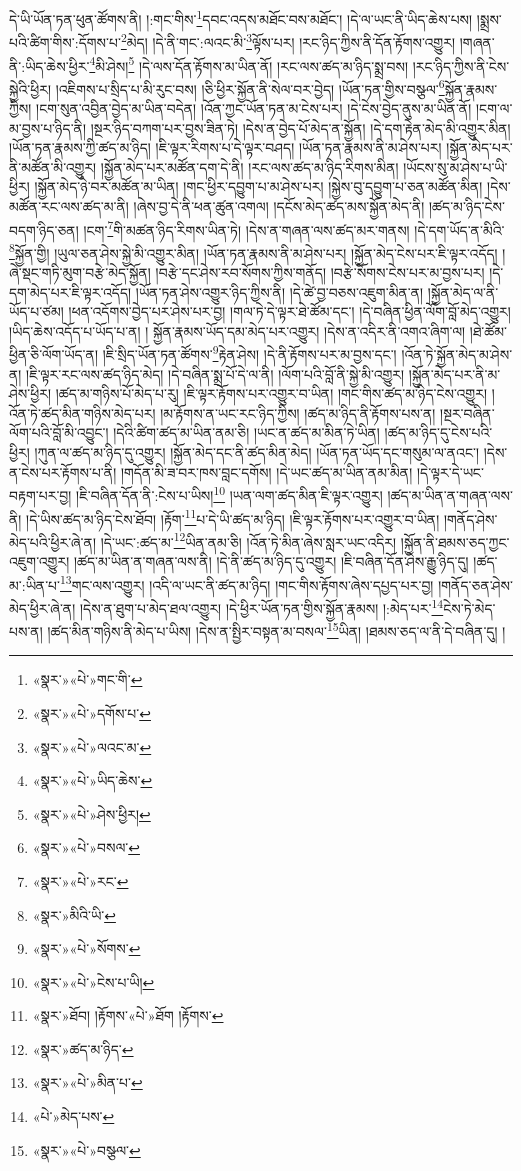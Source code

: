 དེ་ཡི་ཡོན་ཏན་ཕུན་ཚོགས་ནི། །:གང་གིས་\footnote{«སྣར་»«པེ་»གང་གི་}དབང་འདས་མཐོང་བས་མཐོང་། །དེ་ལ་ཡང་ནི་ཡིད་ཆེས་པས། །སྨྲས་པའི་ཚིག་གིས་:དོགས་པ་\footnote{«སྣར་»«པེ་»དགོས་པ་}མེད། །དེ་ནི་གང་:ལའང་མི་\footnote{«སྣར་»«པེ་»ལའང་མ་}ལྟོས་པར། །རང་ཉིད་ཀྱིས་ནི་དོན་རྟོགས་འགྱུར། །གཞན་ནི་:ཡིད་ཆེས་ཕྱིར་\footnote{«སྣར་»«པེ་»ཡིད་ཆེས་}མི་ཤེས།\footnote{«སྣར་»«པེ་»ཤེས་ཕྱིར།} །དེ་ལས་དོན་རྟོགས་མ་ཡིན་ནོ། །རང་ལས་ཚད་མ་ཉིད་སྨྲ་བས། །རང་ཉིད་ཀྱིས་ནི་ངེས་སྐྱེའི་ཕྱིར། །འཇིགས་པ་སྲིད་པ་མི་རུང་བས། །ཅི་ཕྱིར་སྐྱོན་ནི་སེལ་བར་བྱེད། །ཡོན་ཏན་གྱིས་བསྩལ་\footnote{«སྣར་»«པེ་»བསལ་}སྐྱོན་རྣམས་ཀྱིས། །ངག་སུན་འབྱིན་བྱེད་མ་ཡིན་བདེན། །འོན་ཀྱང་ཡོན་ཏན་མ་ངེས་པར། །དེ་ངེས་བྱེད་ནུས་མ་ཡིན་ནོ། །ངག་ལ་མ་བྱས་པ་ཉིད་ནི། །སྔར་ཉིད་བཀག་པར་བྱས་ཟིན་ཏེ། །དེས་ན་བྱེད་པོ་མེད་ན་སྐྱོན། །དེ་དག་རྟེན་མེད་མི་འགྱུར་མིན། །ཡོན་ཏན་རྣམས་ཀྱི་ཚད་མ་ཉིད། །ཇི་ལྟར་རིགས་པ་དེ་ལྟར་བཤད། །ཡོན་ཏན་རྣམས་ནི་མ་ཤེས་པར། །སྐྱོན་མེད་པར་ནི་མཚོན་མི་འགྱུར། །སྐྱོན་མེད་པར་མཚོན་དག་དེ་ནི། །རང་ལས་ཚད་མ་ཉིད་རིགས་མིན། །ཡོངས་སུ་མ་ཤེས་པ་ཡི་ཕྱིར། །སྐྱོན་མེད་ཉེ་བར་མཚོན་མ་ཡིན། །གང་ཕྱིར་དབྱུག་པ་མ་ཤེས་པར། །སྐྱེས་བུ་དབྱུག་པ་ཅན་མཚོན་མིན། །དེས་མཚོན་རང་ལས་ཚད་མ་ནི། །ཞེས་བྱ་དེ་ནི་ཕན་ཚུན་འགལ། །དངོས་མེད་ཚད་མས་སྐྱོན་མེད་ནི། །ཚད་མ་ཉིད་ངེས་བདག་ཉིད་ཅན། །ངག་\footnote{«སྣར་»«པེ་»རང་}གི་མཚན་ཉིད་རིགས་ཡིན་ཏེ། །དེས་ན་གཞན་ལས་ཚད་མར་གནས། །དེ་དག་ཡོད་ན་མིའི་\footnote{«སྣར་»མིའི་ཡི་}སྐྱོན་གྱི། །ཡུལ་ཅན་ཤེས་སྐྱེ་མི་འགྱུར་མིན། །ཡོན་ཏན་རྣམས་ནི་མ་ཤེས་པར། །སྐྱོན་མེད་ངེས་པར་ཇི་ལྟར་འདོད། །ཞེ་སྡང་གཏི་མུག་བརྩེ་མེད་སྐྱོན། །བརྩེ་དང་ཤེས་རབ་སོགས་ཀྱིས་གནོད། །བརྩེ་སོགས་ངེས་པར་མ་བྱས་པར། །དེ་དག་མེད་པར་ཇི་ལྟར་འདོད། །ཡོན་ཏན་ཤེས་འགྱུར་ཉིད་ཀྱིས་ནི། །དེ་ཚེ་བྱ་བཅས་འཇུག་མིན་ན། །སྐྱོན་མེད་ལ་ནི་ཡོད་པ་ཙམ། །ཕན་འདོགས་བྱེད་པར་ཤེས་པར་བྱ། །གལ་ཏེ་དེ་ལྟར་ཐེ་ཚོམ་དང་། །དེ་བཞིན་ཕྱིན་ལོག་བློ་མེད་འགྱུར། །ཡིད་ཆེས་འདོད་པ་ཡོད་པ་ན། །
སྐྱོན་རྣམས་ཡོད་དམ་མེད་པར་འགྱུར། །དེས་ན་འདིར་ནི་འགའ་ཞིག་ལ། །ཐེ་ཚོམ་ཕྱིན་ཅི་ལོག་ཡོད་ན། །ཇི་སྲིད་ཡོན་ཏན་ཚོགས་\footnote{«སྣར་»«པེ་»སོགས་}རྟེན་ཤེས། །དེ་ནི་རྟོགས་པར་མ་བྱས་དང་། །འོན་ཏེ་སྐྱོན་མེད་མ་ཤེས་ན། །ཇི་ལྟར་རང་ལས་ཚད་ཉིད་མེད། །དེ་བཞིན་སྨྲ་པོ་དེ་ལ་ནི། །ལོག་པའི་བློ་ནི་སྐྱེ་མི་འགྱུར། །སྐྱོན་མེད་པར་ནི་མ་ཤེས་ཕྱིར། །ཚད་མ་གཉིས་པོ་མེད་པ་རུ། །ཇི་ལྟར་རྟོགས་པར་འགྱུར་བ་ཡིན། །གང་གིས་ཚད་མ་ཉིད་ངེས་འགྱུར། །འོན་ཏེ་ཚད་མིན་གཉིས་མེད་པར། །མ་རྟོགས་ན་ཡང་རང་ཉིད་ཀྱིས། །ཚད་མ་ཉིད་ནི་རྟོགས་པས་ན། །སྔར་བཞིན་ལོག་པའི་བློ་མི་འབྱུང་། །དེའི་ཚིག་ཚད་མ་ཡིན་ནམ་ཅི། །ཡང་ན་ཚད་མ་མིན་ཏེ་ཡིན། །ཚད་མ་ཉིད་དུ་ངེས་པའི་ཕྱིར། །ཀུན་ལ་ཚད་མ་ཉིད་དུ་འགྱུར། །སྐྱོན་མེད་དང་ནི་ཚད་མིན་མེད། །ཡོན་ཏན་ཡོད་དང་གསུམ་ལ་ནའང་། །དེས་ན་ངེས་པར་རྟོགས་པ་ནི། །གདོན་མི་ཟ་བར་ཁས་བླང་དགོས། །དེ་ཡང་ཚད་མ་ཡིན་ནམ་མིན། །དེ་ལྟར་དེ་ཡང་བརྟག་པར་བྱ། །ཇི་བཞིན་དོན་ནི་:ངེས་པ་ཡིས།\footnote{«སྣར་»«པེ་»ངེས་པ་ཡི།} །ཡན་ལག་ཚད་མིན་ཇི་ལྟར་འགྱུར། །ཚད་མ་ཡིན་ན་གཞན་ལས་ནི། །དེ་ཡིས་ཚད་མ་ཉིད་ངེས་ཐོབ། །རྟོག་\footnote{«སྣར་»ཐོབ། །རྟོགས་«པེ་»ཐོག །རྟོགས་}པ་དེ་ཡི་ཚད་མ་ཉིད། །ཇི་ལྟར་རྟོགས་པར་འགྱུར་བ་ཡིན། །གནོད་ཤེས་མེད་པའི་ཕྱིར་ཞེ་ན། །དེ་ཡང་:ཚད་མ་\footnote{«སྣར་»ཚད་མ་ཉིད་}ཡིན་ནམ་ཅི། །འོན་ཏེ་མིན་ཞེས་སླར་ཡང་འདིར། །སྐྱོན་ནི་ཐམས་ཅད་ཀྱང་འཇུག་འགྱུར། །ཚད་མ་ཡིན་ན་གཞན་ལས་ནི། །དེ་ནི་ཚད་མ་ཉིད་དུ་འགྱུར། །ཇི་བཞིན་དོན་ཤེས་རྒྱུ་ཉིད་དུ། །ཚད་མ་:ཡིན་པ་\footnote{«སྣར་»«པེ་»མིན་པ་}གང་ལས་འགྱུར། །འདི་ལ་ཡང་ནི་ཚད་མ་ཉིད། །གང་གིས་རྟོགས་ཞེས་དཔྱད་པར་བྱ། །གནོད་ཅན་ཤེས་མེད་ཕྱིར་ཞེ་ན། །དེས་ན་ཐུག་པ་མེད་ཐལ་འགྱུར། །དེ་ཕྱིར་ཡོན་ཏན་གྱིས་སྐྱོན་རྣམས། །:མེད་པར་\footnote{«པེ་»མེད་པས་}ངེས་ཏེ་མེད་པས་ན། །ཚད་མིན་གཉིས་ནི་མེད་པ་ཡིས། །དེས་ན་སྤྱིར་བསྟན་མ་བསལ་\footnote{«སྣར་»«པེ་»བསྩལ་}ཡིན། །ཐམས་ཅད་ལ་ནི་དེ་བཞིན་དུ། །
